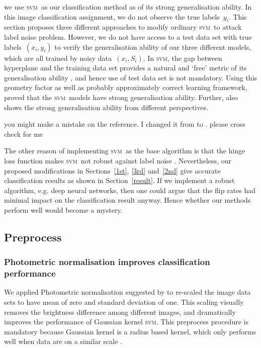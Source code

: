 \documentclass[12pt]{article} %
\newcommand{\svm}{\textsc{svm}}
\begin{document}
we use \svm\ as our classification method as of its strong generalisation ability. In this image classification assignment, we do not observe the true  labels~$y_i$. This section proposes three different approaches to modify ordinary \svm\ to attack label noise problem. However, we do not have access to a test data set with true labels~$(x_i,y_i)$ to verify the generalisation ability of our three different models, which are all trained by noisy data~$(x_i,S_i)$. In \svm , the gap between hyperplane and the training data set provides a natural and `free' metric of its generalisation ability  \citep{hastie01statisticallearning}, and hence use of test data set is not mandatory. Using this geometry factor as well as probably approximately correct learning framework,  \citet{NIPS2012_4500} proved that the  \svm\ models have strong generalisation ability. Further,  \citep{Cortes1995,Seeger:2003:PGE:944919.944929} also shows the strong generalisation ability from different perspectives.

{\color{red} you might make a mistake on the reference. I changed it from \citet{Fernandez-Delgado:2014:WNH:2627435.2697065} to \citep{frenay2014classification}. please cross check for me}

The other reason of implementing \svm\ as the base algorithm is that the hinge loss function makes \svm\ not robust against label noise \citep{frenay2014classification}. Nevertheless, our proposed modifications in Sections~\ref{1st}, \ref{3rd} and~\ref{2nd} give accurate classification results as shown in Section~\ref{result}. If we implement a robust algorithm, e.g. deep neural networks, then one could argue that the flip rates had minimal impact on the classification result anyway. Hence whether our methods perform well would become a mystery.


\subsection{Preprocess}\label{preproc}
\subsubsection{Photometric normalisation improves classification performance}
We applied Photometric normalisation suggested by \citet{jonsson2002support} to re-scaled the image data sets to have mean of zero and standard deviation of one. This scaling visually removes the brightness difference among different images, and dramatically improves the performance of Gaussian kernel \svm . This preprocess procedure is mandatory because Gaussian kernel is a radius based kernel, which only performs well when data are on a similar scale \citep{jonsson2002support}.
\end{document}
